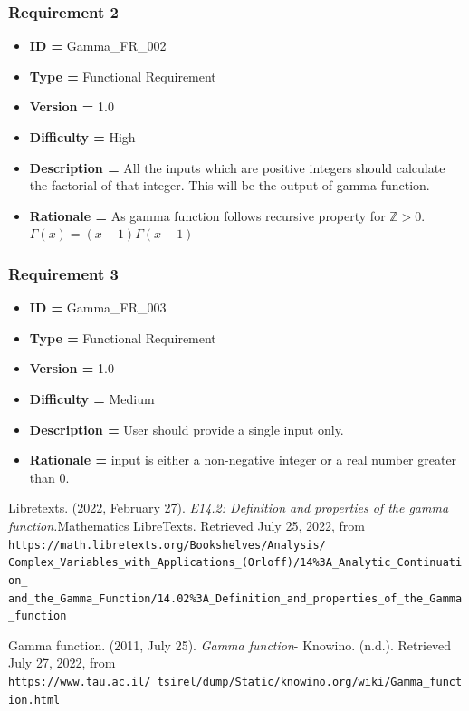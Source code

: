 \documentclass[12pt]{report}
\begin{document}
\subsubsection{Requirement 2}
\begin{itemize}
    \item \textbf{ID = }Gamma\_FR\_002
    \item \textbf{Type = }Functional Requirement
    \item \textbf{Version = } 1.0
    \item \textbf{Difficulty = }High
    \item \textbf{Description = } All the inputs which are positive integers should calculate the factorial of that integer. This will be the output of gamma function.
    \item \textbf{Rationale = }As gamma function follows recursive property for $\mathbb{Z}>0.$ $\Gamma(x)=(x-1)\Gamma(x-1)$
\end{itemize}

\subsubsection{Requirement 3}
\begin{itemize}
    \item \textbf{ID = }Gamma\_FR\_003
    \item \textbf{Type = }Functional Requirement
    \item \textbf{Version = } 1.0
    \item \textbf{Difficulty = }Medium
    \item \textbf{Description = } User should provide a single input only.
    \item \textbf{Rationale = }input is either a non-negative integer or a real number greater than 0.
\end{itemize}


\begin{thebibliography}{9}
Libretexts. (2022, February 27). \textit{E14.2: Definition and properties of the gamma function.}Mathematics LibreTexts. Retrieved July 25, 2022, from \texttt{https://math.libretexts.org/Bookshelves/Analysis/\\Complex\_Variables\_with\_Applications\_(Orloff)/14\%3A\_Analytic\_Continuation\_\\and\_the\_Gamma\_Function/14.02\%3A\_Definition\_and\_properties\_of\_the\_Gamma\_function}

Gamma function. (2011, July 25). \textit{Gamma function}- Knowino. (n.d.). Retrieved July 27, 2022, from\\ \texttt{https://www.tau.ac.il/~tsirel/dump/Static/knowino.org/wiki/Gamma\_function.html}

\end{thebibliography}
\end{document}
